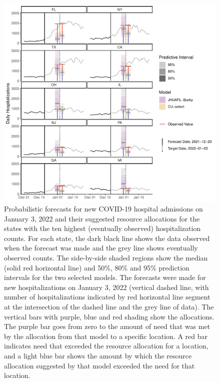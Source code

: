 \documentclass{article}\usepackage[]{graphicx}\usepackage[]{xcolor}
\makeatletter
\def\maxwidth{ %
  \ifdim\Gin@nat@width>\linewidth
    \linewidth
  \else
    \Gin@nat@width
  \fi
}
\newenvironment{knitrout}{}{} %
\makeatother
\begin{document}
\begin{knitrout}
\color{fgcolor}\begin{figure}
\includegraphics[width=\maxwidth]{figure/thermometer-plot-1} \caption[Probabilistic forecasts for new COVID-19 hospital admissions on January 3, 2022 and their suggested resource allocations for the states with the ten highest (eventually observed) hospitalization counts]{Probabilistic forecasts for new COVID-19 hospital admissions on January 3, 2022 and their suggested resource allocations for the states with the ten highest (eventually observed) hospitalization counts. For each state, the dark black line shows the data observed when the forecast was made and the grey line shows eventually observed counts. The side-by-side shaded regions show the median (solid red horizontal line) and 50\%, 80\% and 95\% prediction intervals for the two selected models. The forecasts were made for new hospitalizations on January 3, 2022 (vertical dashed line, with number of hospitalizations indicated by red horizontal line segment at the intersection of the dashed line and the grey line of data). The vertical bars with purple, blue and red shading show the allocations. The purple bar goes from zero to the amount of need that was met by the allocation from that model to a specific location. A red bar indicates need that exceeded the resource allocation for a location, and a light blue bar shows the amount by which the resource allocation suggested by that model exceeded the need for that location.}\label{fig:thermometer-plot}
\end{figure}

\end{knitrout}
\end{document}
